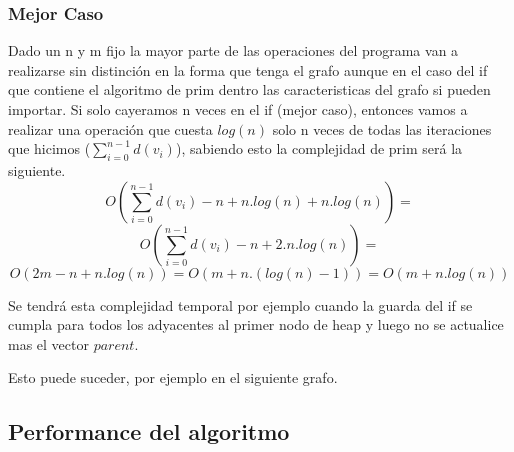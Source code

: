 \subsubsection{Mejor Caso}

Dado un n y m fijo la mayor parte de las operaciones del programa van a realizarse sin distinción en la forma que tenga el grafo aunque en el caso del if que contiene el algoritmo de prim dentro las caracteristicas del grafo si pueden importar. Si solo cayeramos n veces en el if (mejor caso), entonces vamos a realizar una operación que cuesta $log(n)$ solo n veces de todas las iteraciones que hicimos ($\sum_{i=0}^{n-1}d(v_{i})$), sabiendo esto la complejidad de prim será la siguiente.
	$$O( \sum_{i=0}^{n-1}d(v_{i}) - n + n.log(n) + n.log(n) ) = $$
	$$O( \sum_{i=0}^{n-1}d(v_{i}) - n + 2.n.log(n) ) = $$
	$$O( 2m - n + n.log(n) ) = O( m + n.(log(n)-1) ) = O( m + n.log(n)) $$

Se tendrá esta complejidad temporal por ejemplo cuando la guarda del if se cumpla para todos los adyacentes al primer nodo de heap y luego no se actualice mas el vector $parent$.

Esto puede suceder, por ejemplo en el siguiente grafo.
	
\begin{figure}[H]
\centering
%
\end{figure}

\subsection{Performance del algoritmo}

